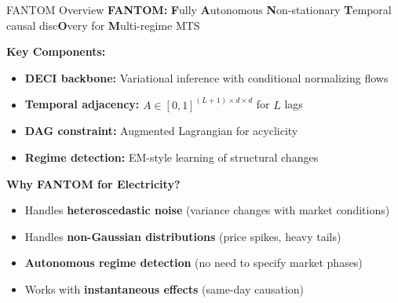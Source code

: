 \documentclass[aspectratio=169]{beamer}
\begin{document}
\begin{frame}{FANTOM Overview}
\textbf{FANTOM:} \textbf{F}ully \textbf{A}utonomous \textbf{N}on-stationary \textbf{T}emporal causal disc\textbf{O}very for \textbf{M}ulti-regime MTS

\vspace{0.3cm}
\textbf{Key Components:}
\begin{itemize}
    \item \textbf{DECI backbone:} Variational inference with conditional normalizing flows
    \item \textbf{Temporal adjacency:} $A \in [0,1]^{(L+1) \times d \times d}$ for $L$ lags
    \item \textbf{DAG constraint:} Augmented Lagrangian for acyclicity
    \item \textbf{Regime detection:} EM-style learning of structural changes
\end{itemize}

\vspace{0.3cm}
\textbf{Why FANTOM for Electricity?}
\begin{itemize}
    \item Handles \textbf{heteroscedastic noise} (variance changes with market conditions)
    \item Handles \textbf{non-Gaussian distributions} (price spikes, heavy tails)
    \item \textbf{Autonomous regime detection} (no need to specify market phases)
    \item Works with \textbf{instantaneous effects} (same-day causation)
\end{itemize}
\end{frame}
\end{document}
